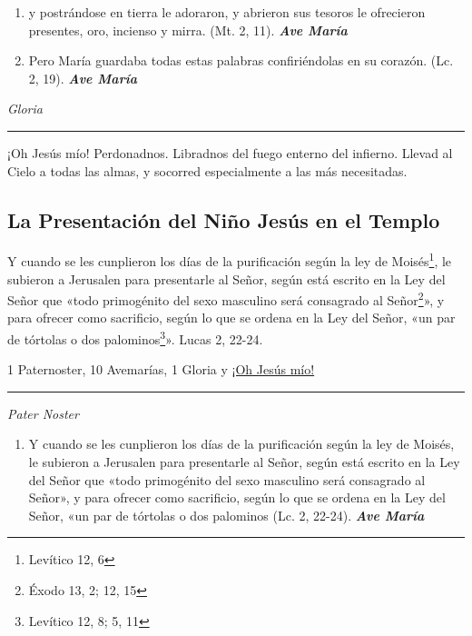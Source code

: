 \documentclass[a4paper,11pt, oneside]{report}
\begin{document}
{{\begin{enumerate}
      \item y postrándose en tierra le adoraron, y abrieron sus tesoros le ofrecieron presentes, oro, incienso y mirra. (Mt. 2, 11). \textbf{\textit{Ave María}}

      \item Pero María guardaba todas estas palabras confiriéndolas en su corazón. (Lc. 2, 19). \textbf{\textit{Ave María}}
    \end{enumerate}
    \indent\textit{Gloria}  
      
    \begin{center}\rule{1\linewidth}{\linethickness}\end{center}
    
    \hypertarget{finalNatividad}{¡Oh Jesús mío! Perdonadnos. Libradnos del fuego enterno del infierno. Llevad al Cielo a todas las almas, y socorred especialmente a las más 
    necesitadas.}
  }
    
  \subsection*{La Presentación del Niño Jesús en el Templo}
  {
    
    Y cuando se les cunplieron los días de la purificación según la ley de Moisés\footnote{Levítico 12, 6}, le subieron a Jerusalen para presentarle al Señor, según está escrito
    en la Ley del Señor que «todo primogénito del sexo masculino será consagrado al Señor\footnote{Éxodo 13, 2; 12, 15}», y para ofrecer como sacrificio, según lo que 
    se ordena en la Ley del Señor, «un par de tórtolas o dos palominos\footnote{Levítico 12, 8; 5, 11}». Lucas 2, 22-24.

    \medskip

    1 Paternoster, 10 Avemarías, 1 Gloria y \hyperlink{finalPresentacion}{¡Oh Jesús mío!}
    

    \medskip

    \begin{center}\rule{1\linewidth}{\linethickness}\end{center}

    \medskip
    \textit{Pater Noster}

    \begin{enumerate}
      
      \item Y cuando se les cunplieron los días de la purificación según la ley de Moisés, le subieron a Jerusalen para presentarle al Señor, 
      según está escrito en la Ley del Señor que «todo primogénito del sexo masculino será consagrado al Señor», y para ofrecer como sacrificio, 
      según lo que se ordena en la Ley del Señor, «un par de tórtolas o dos palominos
      (Lc. 2, 22-24). \textbf{\textit{Ave María}}


\end{enumerate}}}
\end{document}
